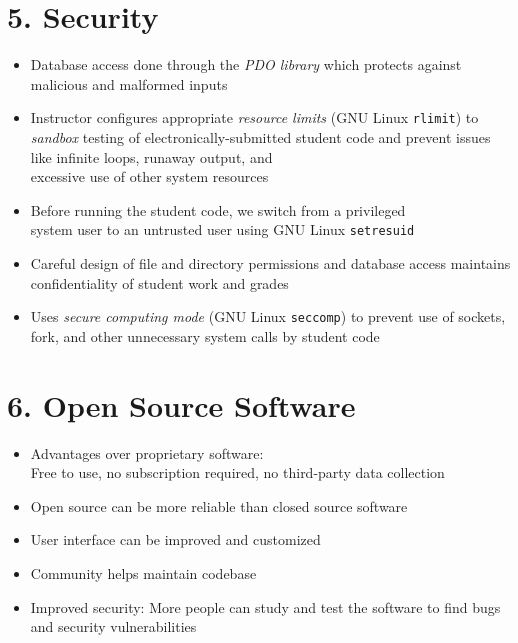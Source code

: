 \documentclass[thesis]{hmcposter}
\begin{document}
\begin{poster}
\vspace{-0.2in}

\section{5. Security}
    \begin{itemize}
        \item Database access done through the \textit{PDO library} which protects against malicious and malformed inputs
        \item 

Instructor configures appropriate \textit{resource limits} (GNU Linux {\tt rlimit}) to
{\em sandbox} testing of electronically-submitted student code and prevent issues like infinite loops, runaway output, and \\ excessive use of other system resources 

        \item Before running the student code, we switch from a privileged \\ system user to an untrusted user using GNU Linux {\tt setresuid}
        \item Careful design of file and directory permissions and database access maintains confidentiality of student work and grades
        \item Uses {\em secure computing mode} (GNU Linux {\tt seccomp}) to prevent use of sockets, fork, and other unnecessary system calls by student code
    \end{itemize}
    
\columnbreak

\section{6. Open Source Software}
    \begin{itemize}
        \item Advantages over proprietary software: \\
Free to use, no subscription required, no third-party data collection
        \item Open source can be more reliable than closed source software
        \item User interface can be improved and customized
        \item Community helps maintain codebase
        \item Improved security:  More people can study and test the software to find bugs and security vulnerabilities
    \end{itemize}


\end{poster}
\end{document}
